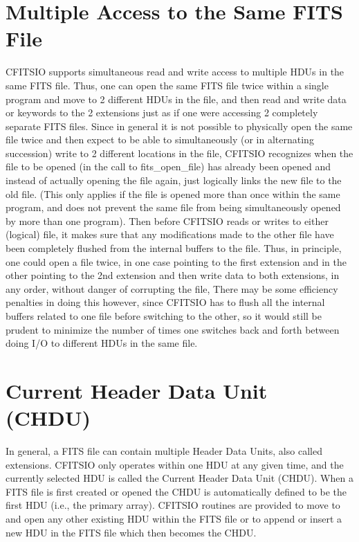 \documentclass[11pt]{book}
\begin{document}
\section{Multiple Access to the Same FITS File}

CFITSIO supports simultaneous read and write access to multiple HDUs in
the same FITS file.  Thus, one can open the same FITS file twice within
a single program and move to 2 different HDUs in the file, and then
read and write data or keywords to the 2 extensions just as if one were
accessing 2 completely separate FITS files.   Since in general it is
not possible to physically open the same file twice and then expect to
be able to simultaneously (or in alternating succession) write to 2
different locations in the file, CFITSIO recognizes when the file to be
opened (in the call to fits\_open\_file) has already been opened and
instead of actually opening the file again, just logically links the
new file to the old file.  (This only applies if the file is opened
more than once within the same program, and does not prevent the same
file from being simultaneously opened by more than one program).  Then
before CFITSIO reads or writes to either (logical) file, it makes sure
that any modifications made to the other file have been completely
flushed from the internal buffers to the file.  Thus, in principle, one
could open a file twice, in one case pointing to the first extension
and in the other pointing to the 2nd extension and then write data to
both extensions, in any order, without danger of corrupting the file,
There may be some efficiency penalties in doing this however, since
CFITSIO has to flush all the internal buffers related to one file
before switching to the  other, so it would still be prudent to
minimize the number of times one switches back and forth between doing
I/O to different HDUs in the same file.


\section{Current Header Data Unit (CHDU)}

In general, a FITS file can contain multiple Header Data Units, also
called extensions.  CFITSIO only operates within one HDU at any given
time, and the currently selected HDU is called the Current Header Data
Unit (CHDU).  When a FITS file is first created or opened the CHDU is
automatically defined to be the first HDU (i.e., the primary array).
CFITSIO routines are provided to move to and open any other existing
HDU within the FITS file or to append or insert a new HDU in the FITS
file which then becomes the CHDU.
\end{document}
